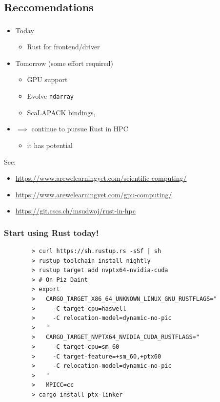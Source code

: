 \documentclass[aspectratio=43, t]{beamer}
\begin{document}
\subsection*{Reccomendations}
\begin{frame}
	\frametitle{\subsecname}
	\begin{itemize}
		\item Today
			\begin{itemize}
				\item Rust for frontend/driver
			\end{itemize}
		\item Tomorrow (some effort required)
			\begin{itemize}
				\item GPU support
				\item Evolve \texttt{ndarray}
				\item ScaLAPACK bindings, \textellipsis
			\end{itemize}
		\item $\implies$ continue to pursue Rust in HPC
			\begin{itemize}
				\item it has potential
			\end{itemize}
	\end{itemize}

	See:
	\begin{itemize}
		\item \url{https://www.arewelearningyet.com/scientific-computing/}
		\item \url{https://www.arewelearningyet.com/gpu-computing/}
		\item \url{https://git.cscs.ch/msudwoj/rust-in-hpc}
	\end{itemize}

\end{frame}

\begin{frame}[fragile]
	\frametitle{Start using Rust today!}
	\begin{verbatim}
		> curl https://sh.rustup.rs -sSf | sh
		> rustup toolchain install nightly
		> rustup target add nvptx64-nvidia-cuda
		> # On Piz Daint
		> export
		>   CARGO_TARGET_X86_64_UNKNOWN_LINUX_GNU_RUSTFLAGS="
		>     -C target-cpu=haswell
		>     -C relocation-model=dynamic-no-pic
		>   "
		>   CARGO_TARGET_NVPTX64_NVIDIA_CUDA_RUSTFLAGS="
		>     -C target-cpu=sm_60
		>     -C target-feature=+sm_60,+ptx60
		>     -C relocation-model=dynamic-no-pic
		>   "
		>   MPICC=cc
		> cargo install ptx-linker
		\end{verbatim}
\end{frame}
\end{document}
